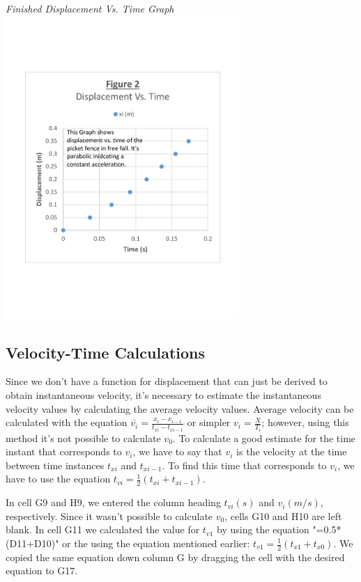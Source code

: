 \documentclass[aps,letterpaper,11pt]{revtex4}
\begin{document}
{\begin{center}
\textit{Finished Displacement Vs. Time Graph}\\
\vspace{-15mm}
\includegraphics[width=3.5in]{DisplacementVsTimeGraph.pdf}
\end{center}    
 
 \vspace{-20mm}
\subsection{Velocity-Time Calculations}

Since we don't have a function for displacement that can just be derived to obtain instantaneous velocity, it's necessary to estimate the instantaneous velocity values by calculating the average velocity values. Average velocity can be calculated with the equation $\bar{v_i} = \frac{x_i - x_{i-1}}{t_{xi} - t_{xi-1}}$ or simpler $v_i = \frac{X}{T_i}$; however, using this method it's not possible to calculate $v_0$. To calculate a good estimate for the time instant that corresponds to $v_i$, we have to say that $v_i$ is the velocity at the time between time instances $t_{xi}$ and $t_{xi-1}$. To find this time that corresponds to $v_i$, we have to use the equation $t_{vi} = \frac{1}{2}(t_{xi}+t_{xi-1})$. 

In cell G9 and H9, we entered the column heading \textbf{$t_{vi} (s)$} and \textbf{$v_{i} (m/s)$}, respectively. Since it wasn't possible to calculate $v_0$, cells G10 and H10 are left blank. In cell G11 we calculated the value for $t_{v1}$ by using the equation "=0.5*(D11+D10)" or the using the equation mentioned earlier: $t_{v1}=\frac{1}{2}(t_{x1}+t_{x0})$. We copied the same equation down column G by dragging the cell with the desired equation to G17. 

}
\end{document}
